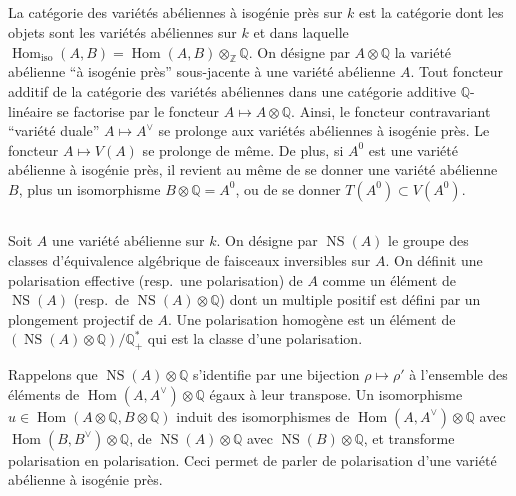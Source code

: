 \documentclass[11pt]{amsart}
\theoremstyle{plain}
\theoremstyle{definition}
\DeclareMathOperator{\Hom}{Hom}
\DeclareMathOperator{\NS}{NS}
\newcommand{\ZZ}{\mathbb{Z}}
\newcommand{\QQ}{\mathbb{Q}}
\begin{document}
\subsection{}

La cat\'egorie des vari\'et\'es ab\'eliennes \`a isog\'enie pr\`es sur $k$ est la cat\'egorie dont les objets sont les vari\'et\'es ab\'eliennes sur $k$ et dans laquelle $\Hom_{\text{iso}}(A,B) = \Hom(A,B) \otimes_{\ZZ} \QQ$. On d\'esigne par $A \otimes \QQ$ la vari\'et\'e ab\'elienne ``\`a isog\'enie pr\`es'' sous-jacente \`a une vari\'et\'e ab\'elienne $A$. Tout foncteur additif de la cat\'egorie des vari\'et\'es ab\'eliennes dans une cat\'egorie additive $\QQ$-lin\'eaire se factorise par le foncteur $A \mapsto A \otimes \QQ$. Ainsi, le foncteur contravariant ``vari\'et\'e duale'' $A \mapsto A^\vee$ se prolonge aux vari\'et\'es ab\'eliennes \`a isog\'enie pr\`es. Le foncteur $A \mapsto V(A)$ se prolonge de m\^eme. De plus, si $A^0$ est une vari\'et\'e ab\'elienne \`a isog\'enie pr\`es, il revient au m\^eme de se donner une vari\'et\'e ab\'elienne $B$, plus un isomorphisme $B \otimes \QQ = A^0$, ou de se donner $T(A^0) \subset V(A^0)$.

\subsection{}

Soit $A$ une vari\'et\'e ab\'elienne sur $k$. On d\'esigne par $\NS(A)$ le groupe des classes d'\'equivalence alg\'ebrique de faisceaux inversibles sur $A$. On d\'efinit une polarisation effective (resp.\ une polarisation) de $A$ comme un \'el\'ement de $\NS(A)$ (resp.\ de $\NS(A) \otimes \QQ$) dont un multiple positif est d\'efini par un plongement projectif de $A$. Une polarisation homog\`ene est un \'el\'ement de $(\NS(A) \otimes \QQ)/\QQ^*_+$ qui est la classe d'une polarisation.

Rappelons que $\NS(A) \otimes \QQ$ s'identifie par une bijection $\rho \mapsto \rho'$ \`a l'ensemble des \'el\'ements de $\Hom(A, A^\vee) \otimes \QQ$ \'egaux \`a leur transpose. Un isomorphisme $u \in \Hom(A \otimes \QQ, B \otimes \QQ)$ induit des isomorphismes de $\Hom(A, A^\vee) \otimes \QQ$ avec $\Hom(B, B^\vee) \otimes \QQ$, de $\NS(A) \otimes \QQ$ avec $\NS(B) \otimes \QQ$, et transforme polarisation en polarisation. Ceci permet de parler de polarisation d'une vari\'et\'e ab\'elienne \`a isog\'enie pr\`es.

\subsection{}
\end{document}
